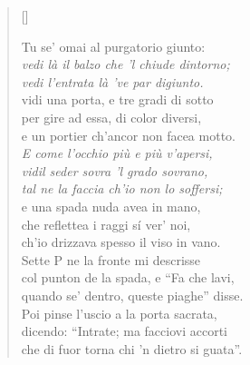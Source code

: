 \documentclass{article}
\begin{document}
\begin{verse}[\versewidth]
  \begin{patverse*}
    Tu se' omai al purgatorio giunto:\\
    \emph{vedi là il balzo che 'l chiude dintorno;\\
    vedi l'entrata là 've par digiunto.}\\[10pt]
    vidi una porta, e tre gradi di sotto\\
    per gire ad essa, di color diversi,\\
    e un portier ch'ancor non facea motto.\\
    \emph{E come l'occhio più e più v'apersi,\\
    vidil seder sovra 'l grado sovrano,\\
    tal ne la faccia ch'io non lo soffersi;}\\
    e una spada nuda avea in mano,\\
    che reflettea i raggi sí ver' noi,\\
    ch'io drizzava spesso il viso in vano.\\[10pt]
    Sette P ne la fronte mi descrisse\\
    col punton de la spada, e ``Fa che lavi,\\
    quando se' dentro, queste piaghe'' disse.\\[10pt]
    Poi pinse l'uscio a la porta sacrata,\\
    dicendo: ``Intrate; ma facciovi accorti\\
    che di fuor torna chi 'n dietro si guata''.
  \end{patverse*}
\end{verse}
\end{document}
